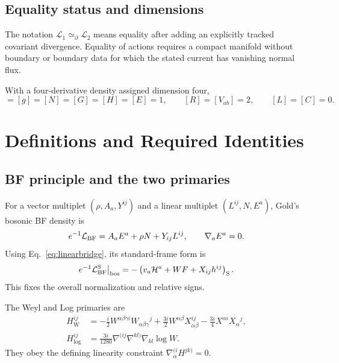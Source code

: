 \documentclass[11pt]{article}
\newcommand{\cL}{\mathcal L}
\newcommand{\simeqbd}{\mathrel{\simeq}_{\partial}}
\newcommand{\Weyl}{\mathrm W}
\newcommand{\Log}{\log}
\newcommand{\std}{\mathrm S}
\begin{document}
\subsection{Equality status and dimensions}

The notation $\cL_1\simeqbd\cL_2$ means equality after adding an explicitly
tracked covariant divergence.  Equality of actions requires a compact
manifold without boundary or boundary data for which the stated current has
vanishing normal flux.

With a four-derivative density assigned dimension four,
\begin{equation}
[\nabla]=[g]=[N]=[G]=[H]=[E]=1,
\qquad [R]=[V_{ab}]=2,\qquad [L]=[C]=0.
\label{eq:dimensions}
\end{equation}

\section{Definitions and Required Identities}

\subsection{BF principle and the two primaries}

For a vector multiplet $(\rho,A_a,Y^{ij})$ and a linear multiplet
$(L^{ij},N,E^a)$, Gold's bosonic BF density is
\begin{equation}
e^{-1}\cL_{\rm BF}=A_aE^a+\rho N+Y_{ij}L^{ij},
\qquad \nabla_aE^a=0.
\label{eq:BF-Gold}
\end{equation}
Using Eq.~\eqref{eq:linearbridge}, its standard-frame form is
\begin{equation}
e^{-1}\cL_{\rm BF}^{\std}\big|_{\rm bos}
=-\left(v_a\mathcal H^a+WF+X_{ij}h^{ij}\right)_{\std}.
\label{eq:BF-standard}
\end{equation}
This fixes the overall normalization and relative signs.

The Weyl and Log primaries are
\begin{align}
H_{\Weyl}^{ij}&=-\frac{i}{2}W^{\alpha\beta\gamma i}
W_{\alpha\beta\gamma}{}^j
+\frac{3i}{2}W^{\alpha\beta}X_{\alpha\beta}^{ij}
-\frac{3i}{4}X^{\alpha i}X_{\alpha}{}^j,
\label{eq:W-primary}\\
H_{\Log}^{ij}&=\frac{3i}{1280}
\nabla^{(ij}\nabla^{kl)}\nabla_{kl}\log W.
\label{eq:L-primary}
\end{align}
They obey the defining linearity constraint
$\nabla_\alpha^{(i}H^{jk)}=0$.
\end{document}
